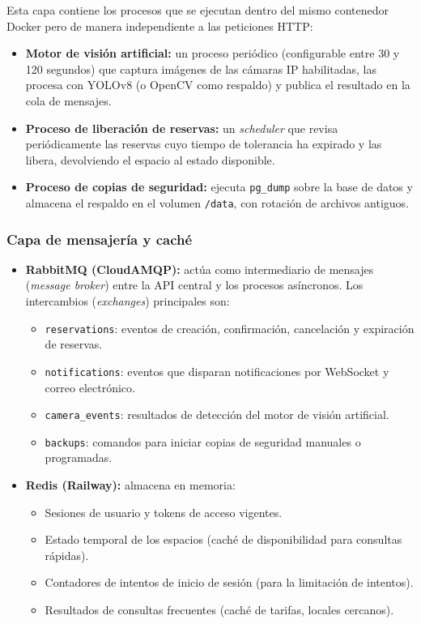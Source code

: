Esta capa contiene los procesos que se ejecutan dentro del mismo contenedor Docker pero de manera independiente a las peticiones HTTP:

\begin{itemize}
    \item \textbf{Motor de visión artificial:} un proceso periódico (configurable entre 30 y 120 segundos) que captura imágenes de las cámaras IP habilitadas, las procesa con YOLOv8 (o OpenCV como respaldo) y publica el resultado en la cola de mensajes.
    \item \textbf{Proceso de liberación de reservas:} un \textit{scheduler} que revisa periódicamente las reservas cuyo tiempo de tolerancia ha expirado y las libera, devolviendo el espacio al estado disponible.
    \item \textbf{Proceso de copias de seguridad:} ejecuta \texttt{pg\_dump} sobre la base de datos y almacena el respaldo en el volumen \texttt{/data}, con rotación de archivos antiguos.
\end{itemize}

\subsubsection{Capa de mensajería y caché}

\begin{itemize}
    \item \textbf{RabbitMQ (CloudAMQP):} actúa como intermediario de mensajes (\textit{message broker}) entre la API central y los procesos asíncronos. Los intercambios (\textit{exchanges}) principales son:
    \begin{itemize}
        \item \texttt{reservations}: eventos de creación, confirmación, cancelación y expiración de reservas.
        \item \texttt{notifications}: eventos que disparan notificaciones por WebSocket y correo electrónico.
        \item \texttt{camera\_events}: resultados de detección del motor de visión artificial.
        \item \texttt{backups}: comandos para iniciar copias de seguridad manuales o programadas.
    \end{itemize}
    \item \textbf{Redis (Railway):} almacena en memoria:
    \begin{itemize}
        \item Sesiones de usuario y tokens de acceso vigentes.
        \item Estado temporal de los espacios (caché de disponibilidad para consultas rápidas).
        \item Contadores de intentos de inicio de sesión (para la limitación de intentos).
        \item Resultados de consultas frecuentes (caché de tarifas, locales cercanos).
    \end{itemize}
\end{itemize}

